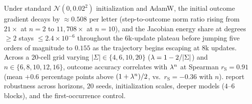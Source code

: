 \begin{table}[!htbp]
\caption{\textbf{Escape time from $\initball$ ($\initscale=0.002$) and from radius $r=0.1$ ($\initscale=0.02$)} under exact population GD on count mod $2$ ($p=1/4$, $\mixrate=1/2$, $3$ seeds).}
\label{tab:exit-times}
\centering\footnotesize
{}
\end{table}

Under standard $\mathcal N(0, 0.02^2)$ initialization and AdamW, the initial outcome gradient decays by $\approx 0.508$ per letter (step-to-outcome norm ratio rising from $21\times$ at $n=2$ to $11{,}708\times$ at $n=10$), and the Jacobian energy share at degrees $\ge 2$ stays $\le 2.4\times 10^{-6}$ throughout the $6$k-update plateau before jumping five orders of magnitude to $0.155$ as the trajectory begins escaping at $8$k updates. Across a $20$-cell grid varying $|\Sigma| \in \{4,6,10,20\}$ ($\lambda = 1 - 2/|\Sigma|$) and $n \in \{6,8,10,12,16\}$, outcome accuracy correlates with $\lambda^n$ at Spearman $r_{\mathrm S} = 0.91$ (mean $+0.6$ percentage points above $(1+\lambda^n)/2$, vs.\ $r_{\mathrm S} = -0.36$ with $n$).  report robustness across horizons, $20$ seeds, initialization scales, deeper models ($4$--$6$ blocks), and the first-occurrence control.

